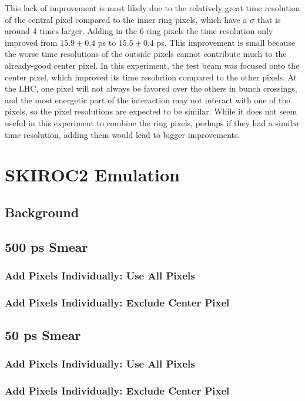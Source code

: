 \documentclass[12pt]{article}
\begin{document}
This lack of improvement is most likely due to the relatively great time resolution of the central pixel compared to the inner ring pixels, which have a $\sigma$ that is around 4 times larger. 
Adding in the 6 ring pixels the time resolution only improved from $15.9 \pm 0.4$ ps to $15.5 \pm 0.4$ ps.
This improvement is small because the worse time resolutions of the outside pixels cannot contribute much to the already-good center pixel.
In this experiment, the test beam was focused onto the center pixel, which improved its time resolution compared to the other pixels. 
At the LHC, one pixel will not always be favored over the others in bunch crossings, and the most energetic part of the interaction may not interact with one of the pixels, so the pixel resolutions are expected to be similar.
While it does not seem useful in this experiment to combine the ring pixels, perhaps if they had a similar time resolution, adding them would lead to bigger improvements.


\section{SKIROC2 Emulation}
\subsection{Background}
\subsection{500 ps Smear}
\subsubsection{Add Pixels Individually: Use All Pixels}
\subsubsection{Add Pixels Individually: Exclude Center Pixel}
\subsection{50 ps Smear}
\subsubsection{Add Pixels Individually: Use All Pixels}
\subsubsection{Add Pixels Individually: Exclude Center Pixel}
\end{document}
